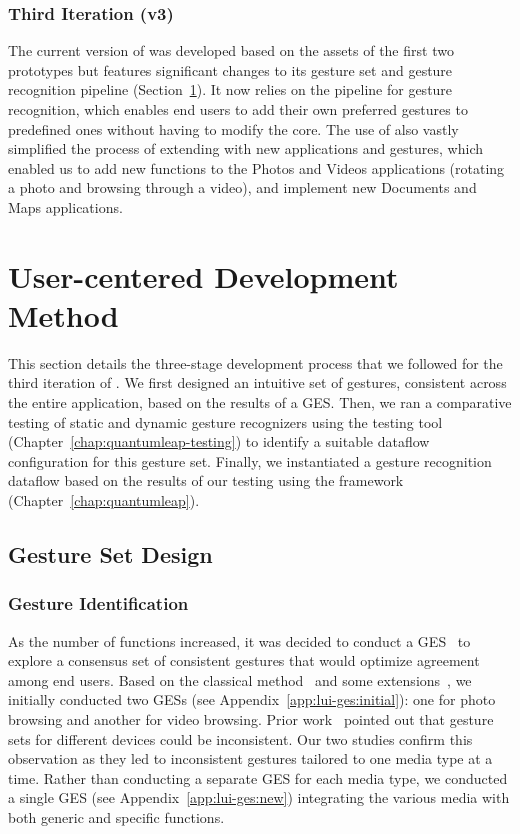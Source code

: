 \subsubsection{Third Iteration (v3)}
The current version of \lui was developed based on the assets of the first two prototypes but features significant changes to its gesture set and gesture recognition pipeline (Section~\ref{sec:lui:development-method}). 
It now relies on the \ql pipeline for gesture recognition, which enables end users to add their own preferred gestures to predefined ones without having to modify the \lui core. The use of \ql also vastly simplified the process of extending \lui with new applications and gestures, which enabled us to add new functions to the Photos and Videos applications (\eg rotating a photo and browsing through a video), and implement new Documents and Maps applications.

\section{User-centered Development Method} \label{sec:lui:development-method}
This section details the three-stage development process that we followed for the third iteration of \lui. 
%
We first designed an intuitive set of gestures, consistent across the entire \lui application, based on the results of a GES. 
%
Then, we ran a comparative testing of static and dynamic gesture recognizers using the \ql testing tool (Chapter~\ref{chap:quantumleap-testing}) to identify a suitable dataflow configuration for this gesture set.
%
Finally, we instantiated a gesture recognition dataflow based on the results of our testing using the \ql framework (Chapter~\ref{chap:quantumleap}).

\subsection{Gesture Set Design} \label{sec:lui:development-method:gesture-set}
\subsubsection{Gesture Identification}
As the number of functions increased, it was decided to conduct a GES~\cite{Wobbrock:2009} to explore a consensus set of consistent gestures that would optimize agreement among end users. Based on the classical method~\cite{Wobbrock:2009} and some extensions~\cite{Gheran:2018}, we initially conducted two GESs (see Appendix~\ref{app:lui-ges:initial}): one for photo browsing and another for video browsing. Prior work~\cite{Anthony:2013,Groenewald:2016} pointed out that gesture sets for different devices could be inconsistent. Our two studies confirm this observation as they led to inconsistent gestures tailored to one media type at a time. 
Rather than conducting a separate GES for each media type, we conducted a single GES (see Appendix~\ref{app:lui-ges:new}) integrating the various media with both generic and specific functions.


